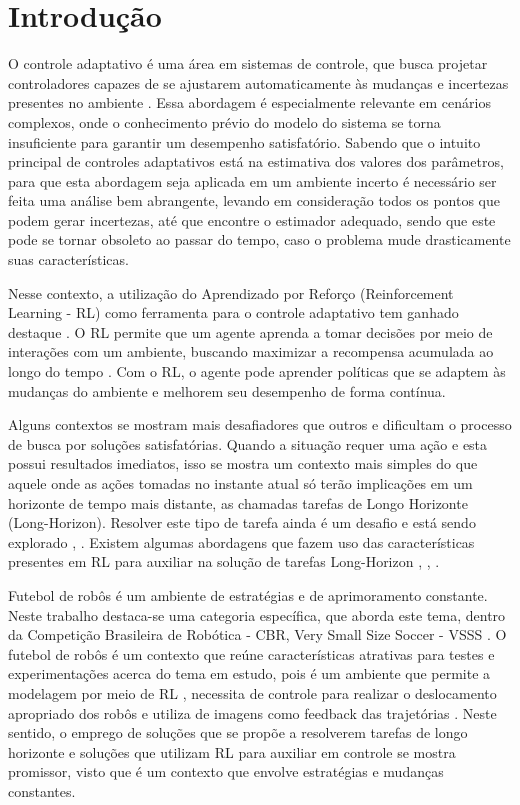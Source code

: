 
\chapter{Introdução}
\label{cap:intro}

O controle adaptativo é uma área em sistemas de controle, que busca projetar controladores capazes de se ajustarem automaticamente às mudanças e incertezas presentes no ambiente \cite{controle_adaptativo_livro}. Essa abordagem é especialmente relevante em cenários complexos, onde o conhecimento prévio do modelo do sistema se torna insuficiente para garantir um desempenho satisfatório. Sabendo que o intuito principal de controles adaptativos está na estimativa dos valores dos parâmetros, para que esta abordagem seja aplicada em um ambiente incerto é necessário ser feita uma análise bem abrangente, levando em consideração todos os pontos que podem gerar incertezas, até que encontre o estimador adequado, sendo que este pode se tornar obsoleto ao passar do tempo, caso o problema mude drasticamente suas características.

Nesse contexto, a utilização do Aprendizado por Reforço (Reinforcement Learning - RL) como ferramenta para o controle adaptativo tem ganhado destaque \cite{ac_rl_intersections}. O RL permite que um agente aprenda a tomar decisões por meio de interações com um ambiente, buscando maximizar a recompensa acumulada ao longo do tempo \cite{sutton}. Com o RL, o agente pode aprender políticas que se adaptem às mudanças do ambiente e melhorem seu desempenho de forma contínua.

Alguns contextos se mostram mais desafiadores que outros e dificultam o processo de busca por soluções satisfatórias. Quando a situação requer uma ação e esta possui resultados imediatos, isso se mostra um contexto mais simples do que aquele onde as ações tomadas no instante atual só terão implicações em um horizonte de tempo mais distante, as chamadas tarefas de Longo Horizonte (Long-Horizon). Resolver este tipo de tarefa ainda é um desafio e está sendo explorado \cite{dream_v1}, \cite{dreamer_v2}. Existem algumas abordagens que fazem uso das características presentes em RL para auxiliar na solução de tarefas Long-Horizon \cite{relay_long_horizon}, \cite{dream_v1}, \cite{dremaer_v3}. 

Futebol de robôs é um ambiente de estratégias e de aprimoramento constante. Neste trabalho destaca-se uma categoria específica, que aborda este tema, dentro da Competição Brasileira de Robótica - CBR, Very Small Size Soccer - VSSS \cite{regras_vss2023}. O futebol de robôs é um contexto que reúne características atrativas para testes e experimentações acerca do tema em estudo, pois é um ambiente que permite a modelagem por meio de RL \cite{bruno_brandao}, necessita de controle para realizar o deslocamento apropriado dos robôs \cite{trabalho_thiago} e utiliza de imagens como feedback das trajetórias \cite{regras_vss2023}. Neste sentido, o emprego de soluções que se propõe a resolverem tarefas de longo horizonte e soluções que utilizam RL para auxiliar em controle se mostra promissor, visto que é um contexto que envolve estratégias e mudanças constantes. 

